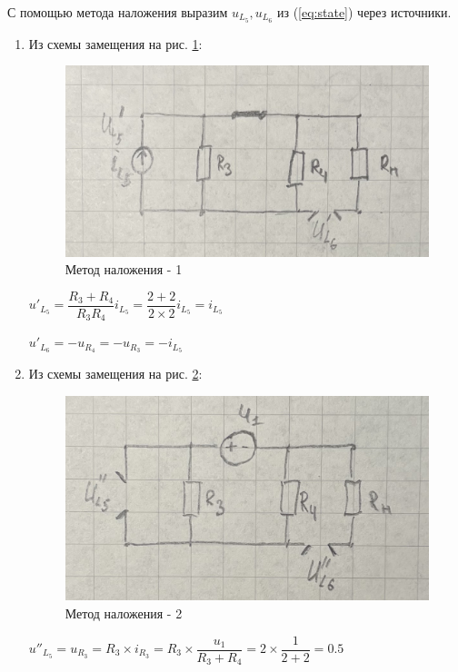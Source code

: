 С помощью метода наложения выразим 
$ u_{L_5}, u_{L_6} $ из (\ref{eq:state})
через источники.

\begin{enumerate}
    \item Из схемы замещения на рис. \ref{fig:circ_overlay_1}:
    
    \begin{figure}[H]
        \centering
        \includegraphics[width=0.7\linewidth]{photo/circ_overlay_1}
        \caption{Метод наложения - 1}
        \label{fig:circ_overlay_1}
    \end{figure}
    
    $ u'_{L_5} = 
    \dfrac{R_3 + R_4}{R_3 R_4} i_{L_5} = 
    \dfrac{2 + 2}{2 \times 2} i_{L_5} =
    i_{L_5}
    $
    
    $ u'_{L_6} = - u_{R_4} = - u_{R_3} = - i_{L_5} $
    
    \item Из схемы замещения на рис. \ref{fig:circ_overlay_2}:
    
    \begin{figure}[H]
        \centering
        \includegraphics[width=0.7\linewidth]{photo/circ_overlay_2}
        \caption{Метод наложения - 2}
        \label{fig:circ_overlay_2}
    \end{figure}
    
    $ u''_{L_5} = 
    u_{R_3} = 
    R_3 \times i_{R_3} = 
    R_3 \times \dfrac{u_1}{R_3 + R_4} = 
    2 \times \dfrac{1}{2 + 2} = 
    0.5
    $
    

\end{enumerate}
